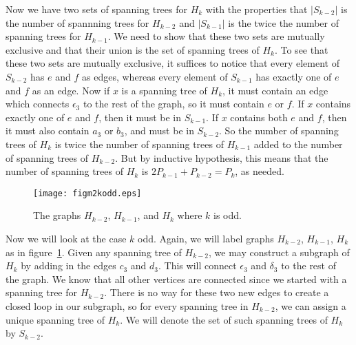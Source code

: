 \documentclass{amsart}
\begin{document}
Now we have two sets of spanning trees for $H_{k}$ with the properties that $|S_{k-2}|$ is the number of spannning trees for $H_{k-2}$ and $|S_{k-1}|$ is the twice the number of spanning trees for $H_{k-1}$.  We need to show that these two sets are mutually exclusive and that their union is the set of spanning trees of $H_{k}$.  To see that these two sets are mutually exclusive, it suffices to notice that every element of $S_{k-2}$ has $e$ and $f$ as edges, whereas every element of $S_{k-1}$ has exactly one of $e$ and $f$ as an edge.  Now if $x$ is a spanning tree of $H_{k}$, it must contain an edge which connects $\epsilon_{3}$ to the rest of the graph, so it must contain $e$ or $f$.  If $x$ contains exactly one of $e$ and $f$, then it must be in $S_{k-1}$. If $x$ contains both $e$ and $f$, then it must also contain $a_{3}$ or $b_{3}$, and must be in $S_{k-2}$.  So the number of spanning trees of $H_{k}$ is twice the number of spanning trees of $H_{k-1}$ added to the number of spanning trees of $H_{k-2}$.  But by inductive hypothesis, this means that the number of spanning trees of $H_{k}$ is $2P_{k-1}+P_{k-2}=P_{k}$, as needed.

\begin{figure}[ht]
\begin{center}
\texttt{[image: figm2kodd.eps]}
\caption{The graphs $H_{k-2}$, $H_{k-1}$, and $H_{k}$ where $k$ is odd.}\label{figm2kodd}
\end{center}
\end{figure} 

Now we will look at the case $k$ odd.  Again, we will label graphs $H_{k-2}$, $H_{k-1}$, $H_{k}$ as in figure~\ref{figm2kodd}.  Given any spanning tree of $H_{k-2}$, we may construct a subgraph of $H_{k}$ by adding in the edges $c_{3}$ and $d_{3}$.  This will connect $\epsilon_{3}$ and $\delta_{3}$ to the rest of the graph.  We know that all other vertices are connected since we started with a spanning tree for $H_{k-2}$.  There is no way for these two new edges to create a closed loop in our subgraph, so for every spanning tree in $H_{k-2}$, we can assign a unique spanning tree of $H_{k}$.  We will denote the set of such spanning trees of $H_{k}$ by $S_{k-2}$.
\end{document}
